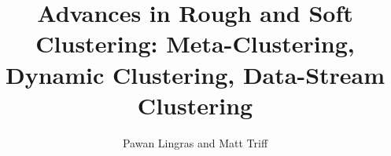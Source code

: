 \documentclass[oribibl]{llncs}
\begin{document}
\titlepage
\title{Advances in Rough and Soft Clustering: Meta-Clustering, Dynamic Clustering, Data-Stream Clustering}

%
%
\author{Pawan Lingras and Matt Triff}


%
%

\maketitle
\end{document}
